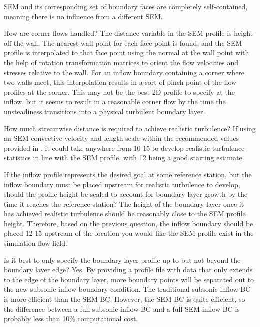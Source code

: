 \begin{QandA}
    SEM and its corresponding set of boundary faces are completely
    self-contained, meaning there is no influence from a different SEM.
%
  \item[How are corner flows handled?]
    The distance variable in the SEM profile is height off the wall. The nearest
    wall point for each face point is found, and the SEM profile is interpolated
    to that face point using the normal at the wall point with the help of
    rotation transformation matrices to orient the flow velocities and stresses
    relative to the wall. For an inflow boundary containing a corner where two
    walls meet, this interpolation results in a sort of pinch-point of the flow
    profiles at the corner. This may not be the best 2D profile to specify at
    the inflow, but it seems to result in a reasonable corner flow by the time
    the unsteadiness transitions into a physical turbulent boundary layer.
%
  \item[How much streamwise distance is required to achieve realistic
    turbulence?]
    If using an SEM convective velocity and length scale within the recommended
    values provided in , it could take
    anywhere from 10-15 \lBC to develop realistic turbulence statistics in line
    with the SEM profile, with 12 \lBC being a good starting estimate.
%
  \item[If the inflow profile represents the desired goal at some reference
    station, but the inflow boundary must be placed upstream for realistic
    turbulence to develop, should the profile height be scaled to account for
    boundary layer growth by the time it reaches the reference station?]
    The height of the boundary layer once it has achieved realistic turbulence
    should be reasonably close to the SEM profile height. Therefore, based on
    the previous question, the inflow boundary should be placed 12-15 \lBC
    upstream of the location you would like the SEM profile exist in the
    simulation flow field.
%
  \item[Is it best to only specify the boundary layer profile up to but not
    beyond the boundary layer edge?]
    Yes. By providing a profile file with data that only extends to the
    edge of the boundary layer, more boundary points will be
    separated out to the new subsonic inflow boundary condition. The traditional
    subsonic inflow BC is more efficient than the SEM BC. However, the SEM BC is
    quite efficient, so the difference between a full subsonic inflow BC and a
    full SEM inflow BC is probably less than 10\% computational cost.

\end{QandA}
